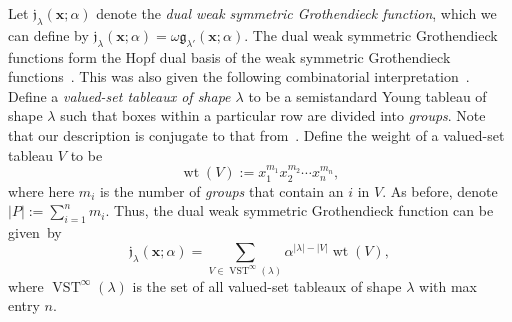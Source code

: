 \documentclass[ALCO,ThmDefs,Unicode,epreuves]{cedram}
\newcommand{\dG}{\mathfrak{g}}  %
\newcommand{\dwG}{\mathfrak{j}}  %
\newcommand{\xx}{\mathbf{x}}
\newcommand{\abs}[1]{\lvert #1 \rvert}
\DeclareMathOperator{\wt}{wt} %
\DeclareMathOperator{\vst}{VST} %
\newcommand{\defn}[1]{{\color{darkred}\emph{#1}}} %
\begin{document}
Let $\dwG_{\lambda}(\xx; \alpha)$ denote the \defn{dual weak symmetric Grothendieck function}, which we can define by $\dwG_{\lambda}(\xx; \alpha) = \omega \dG_{\lambda'}(\xx; \alpha)$. The dual weak symmetric Grothendieck functions form the Hopf dual basis of the weak symmetric Grothendieck functions~\cite[Thm.~9.15]{LamPyl07}. This was also given the following combinatorial interpretation~\cite{LamPyl07}. Define a \defn{valued-set tableaux of shape $\lambda$} to be a semistandard Young tableau of shape $\lambda$ such that boxes within a particular row are divided into \defn{groups}. Note that our description is conjugate to that from~\cite{LamPyl07}.
Define the weight of a valued-set tableau $V$ to be
\[
\wt(V) := x_1^{m_1} x_2^{m_2} \dotsm x_n^{m_n},
\]
where here $m_i$ is the number of \emph{groups} that contain an $i$ in $V$. As before, denote $\abs{P} := \sum_{i=1}^n m_i$.
Thus, the dual weak symmetric Grothendieck function can be given~by
\[
\dwG_{\lambda}(\xx; \alpha) = \sum_{V \in \vst^{\infty}(\lambda)} \alpha^{\abs{\lambda} - \abs{V}} \wt(V),
\]
where $\vst^{\infty}(\lambda)$ is the set of all valued-set tableaux of shape $\lambda$ with max entry $n$.
\end{document}
